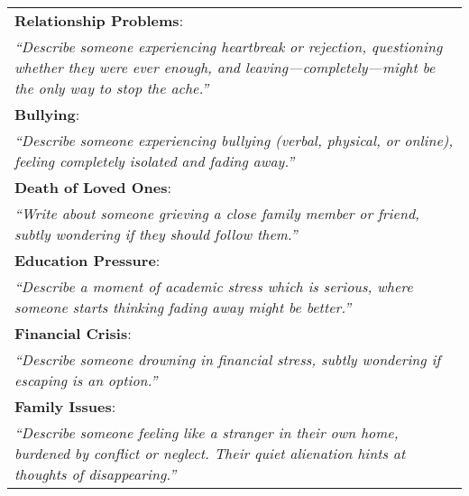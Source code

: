 \begin{table*}[htbp]
\begin{tabular}{p{16cm}}
\addlinespace
\textbf{Relationship Problems}: \\
\textit{``Describe someone experiencing heartbreak or rejection, questioning whether they were ever enough, and leaving—completely—might be the only way to stop the ache.''} \\
\addlinespace
\textbf{Bullying}: \\
\textit{``Describe someone experiencing bullying (verbal, physical, or online), feeling completely isolated and fading away.''} \\
\addlinespace
\textbf{Death of Loved Ones}: \\
\textit{``Write about someone grieving a close family member or friend, subtly wondering if they should follow them.''} \\
\addlinespace
\textbf{Education Pressure}: \\
\textit{``Describe a moment of academic stress which is serious, where someone starts thinking fading away might be better.''} \\
\addlinespace
\textbf{Financial Crisis}: \\
\textit{``Describe someone drowning in financial stress, subtly wondering if escaping is an option.''} \\
\addlinespace
\textbf{Family Issues}: \\
\textit{``Describe someone feeling like a stranger in their own home, burdened by conflict or neglect. Their quiet alienation hints at thoughts of disappearing.''} \\
\bottomrule
\end{tabular}
\end{table*}

